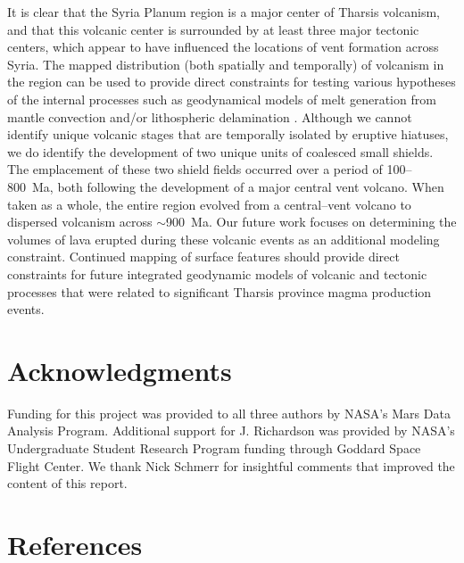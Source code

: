 \documentclass[preprint,review,authoryear,12pt]{elsarticle}
\begin{document}
It is clear that the Syria Planum region is a major center of Tharsis volcanism, and that this volcanic center is surrounded by at least three major tectonic centers, which appear to have influenced the locations of vent formation across Syria. The mapped distribution (both spatially and temporally) of volcanism in the region can be used to provide direct constraints for testing various hypotheses of the internal processes such as geodynamical models of melt generation from mantle convection \citep[e.g.]{ONeill2007} and/or lithospheric delamination \citep[e.g.]{Scott2003}. Although we cannot identify unique volcanic stages that are temporally isolated by eruptive hiatuses, we do identify the development of two unique units of coalesced small shields. The emplacement of these two shield fields occurred over a period of 100--800~Ma, both following the development of a major central vent volcano. When taken as a whole, the entire region evolved from a central--vent volcano to dispersed volcanism across $\sim$900~Ma. Our future work focuses on determining the volumes of lava erupted during these volcanic events as an additional modeling constraint. Continued mapping of surface features should provide direct constraints for future integrated geodynamic models of volcanic and tectonic processes that were related to significant Tharsis province magma production events.

\section{Acknowledgments}

Funding for this project was provided to all three authors by NASA's Mars Data Analysis Program. Additional support for J. Richardson was provided by NASA's Undergraduate Student Research Program funding through Goddard Space Flight Center. We thank Nick Schmerr for insightful comments that improved the content of this report.

\section{References}


\end{document}
